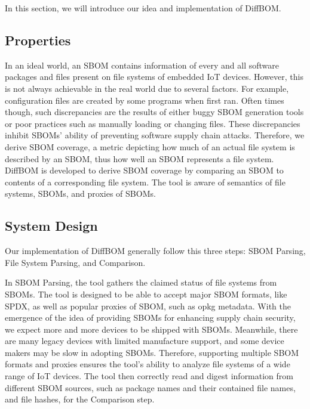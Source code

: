 In this section, we will introduce our idea and implementation of DiffBOM.

\subsection{Properties}

In an ideal world, an SBOM contains information of every and all software
packages and files present on file systems of embedded IoT devices. However,
this is not always achievable in the real world due to several factors. For
example, configuration files are created by some programs when first ran. Often
times though, such discrepancies are the results of either buggy SBOM
generation tools or poor practices such as manually loading or changing files.
These discrepancies inhibit SBOMs' ability of preventing software supply chain
attacks. Therefore, we derive SBOM coverage, a metric depicting how much of an
actual file system is described by an SBOM, thus how well an SBOM represents a
file system. DiffBOM is developed to derive SBOM coverage by comparing an SBOM
to contents of a corresponding file system. The tool is aware of semantics of
file systems, SBOMs, and proxies of SBOMs. %

\subsection{System Design}

Our implementation of DiffBOM generally follow this three steps: SBOM Parsing, File System Parsing, and Comparison.\par %

In SBOM Parsing, the tool gathers the claimed status of file systems from
SBOMs. The tool is designed to be able to accept major SBOM formats, like SPDX,
as well as popular proxies of SBOM, such as opkg metadata. With the emergence
of the idea of providing SBOMs for enhancing supply chain security, we expect
more and more devices to be shipped with SBOMs. Meanwhile, there are many
legacy devices with limited manufacture support, and some device makers may be
slow in adopting SBOMs. Therefore, supporting multiple SBOM formats and proxies
ensures the tool's ability to analyze file systems of a wide range of IoT
devices. The tool then correctly read and digest information from different
SBOM sources, such as package names and their contained file names, and file
hashes, for the Comparison step.\par

